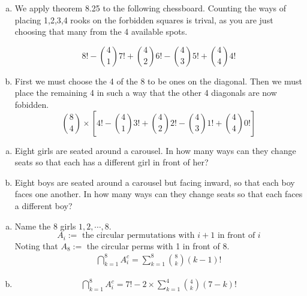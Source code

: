 \documentclass[12pt,letterpaper,boxed]{hmcpset}
\begin{document}
\begin{solution}
\begin{enumerate}[(a)]
\item We apply theorem 8.25 to the following chessboard. Counting the ways of placing 1,2,3,4 rooks on the forbidden squares is trival, as you are just choosing that many from the 4 available spots.\\
$$\boxed{8!-\binom{4}{1}7!+\binom{4}{2}6!-\binom{4}{3}5!+\binom{4}{4}4!}$$
\item First we must choose the 4 of the 8 to be ones on the diagonal. Then we must place the remaining 4 in such a way that the other 4 diagonals are now fobidden. 
$$\binom{8}{4}\times[4!-\binom{4}{1}3!+\binom{4}{2}2!-\binom{4}{3}1!+\binom{4}{4}0!]$$
\end{enumerate}
\end{solution}

\begin{problem}[Shahriari 8.3.2][20]
\begin{enumerate}[(a)]
\item Eight girls are seated around a carousel. In how many ways can they change seats so that each has a different girl in front of her?
\item Eight boys are seated around a carousel but facing inward, so that each boy faces one another. In how many ways can they change seats so that each faces a different boy?
\end{enumerate}
\end{problem}

\begin{solution}
\begin{enumerate}[(a)]
\item Name the 8 girls $1,2,\cdots,8$. 
$$A_i:=\text{ the circular permutations with $i+1$ in front of $i$}$$
Noting that $A_8:=$ the circular perms with 1 in front of 8.
\begin{align*}
\bigcap_{k=1}^8 A_i^c = \sum_{k=1}^8 \binom{8}{k} (k-1)!
\end{align*}
\item 
\begin{align*}
\bigcap_{k=1}^8 A_i^c =7!- 2\times \sum_{k=1}^4 \binom{4}{k} (7-k)!
\end{align*}
\end{enumerate}
\end{solution}
\end{document}
